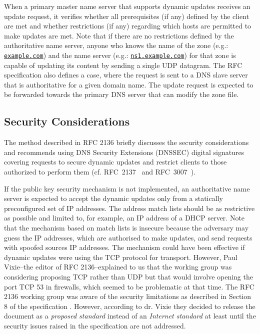 When a primary master name server that supports dynamic updates receives an update request, it verifies whether all prerequisites (if any) defined by the %
client are met and whether restrictions (if any) regarding which hosts are permitted to make updates are met.
Note that if there are no restrictions defined by the authoritative name server, anyone who knows the name of the zone (e.g.: \texttt{\url{example.com}}) and the name server (e.g.: \texttt{\url{ns1.example.com}}) for that zone is capable of updating its content by sending a single UDP datagram.
%
%
The RFC specification also defines a case, where the request is sent to a DNS slave server that is authoritative for a given domain name.
The update request is expected to be forwarded towards the primary DNS server that can modify the zone file.

\subsection{Security Considerations}
The method described in RFC 2136 %
briefly discusses the security considerations and recommends using DNS Security Extensions (DNSSEC) digital signatures covering requests to secure dynamic updates and restrict %
clients to those authorized to perform them %
(cf. RFC~2137~\cite{rfc2137} %
and RFC~3007~\cite{rfc3007}).

If the public key security mechanism is not implemented, an authoritative name server is expected to accept the dynamic updates only from a statically preconfigured set of IP addresses.
The address match lists should be as restrictive as possible and limited to, for example, an IP address of a DHCP server.
Note that the mechanism based on match lists is insecure because the adversary may %
guess the IP addresses, which are authorised to make updates, and send requests with spoofed sources IP addresses.
The mechanism could have been effective if dynamic updates were using the TCP protocol for transport. However, Paul Vixie--the editor of RFC 2136--explained to us that the working group was considering proposing TCP rather than UDP but that would involve opening the port TCP 53 in firewalls, which seemed to be problematic at that time.
The RFC 2136 working group was aware of the security limitations as described in Section 8 of the specification \cite{rfc2136}. 
However, according to dr. Vixie they decided to release the document as a \textit{proposed standard} instead of an \textit{Internet standard} at least until the security issues raised in the specification are not addressed. 

